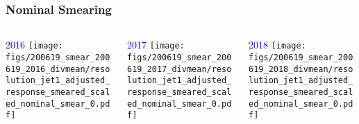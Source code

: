 \documentclass{beamer}
\begin{document}
\begin{frame}
  \frametitle{Nominal Smearing}

  \begin{columns}
    \begin{column}{0.33\linewidth}
      \centering
      \textcolor{blue}{2016}
      \texttt{[image: figs/200619\_smear\_200619\_2016\_divmean/resolution\_jet1\_adjusted\_response\_smeared\_scaled\_nominal\_smear\_0.pdf]}
    \end{column}
    \begin{column}{0.34\linewidth}
      \centering
      \textcolor{blue}{2017}
      \texttt{[image: figs/200619\_smear\_200619\_2017\_divmean/resolution\_jet1\_adjusted\_response\_smeared\_scaled\_nominal\_smear\_0.pdf]}
    \end{column}
    \begin{column}{0.33\linewidth}
      \centering
      \textcolor{blue}{2018}
      \texttt{[image: figs/200619\_smear\_200619\_2018\_divmean/resolution\_jet1\_adjusted\_response\_smeared\_scaled\_nominal\_smear\_0.pdf]}
    \end{column}
  \end{columns}

\end{frame}
\end{document}
